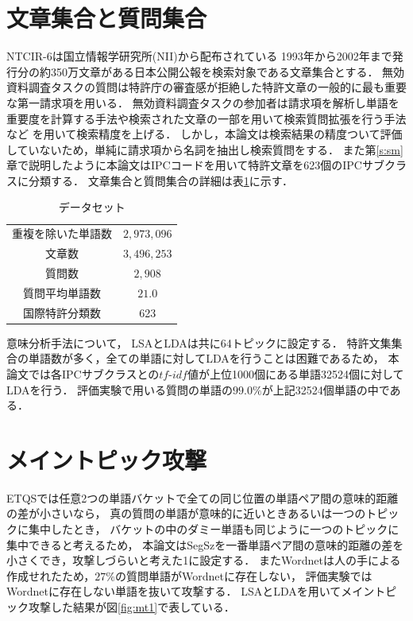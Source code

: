 \documentclass[master]{suribt}
\theoremstyle{definition}
\begin{document}
 \section{文章集合と質問集合}\label{s:ex}
 NTCIR-6は国立情報学研究所(NII)から配布されている
 1993年から2002年まで発行分の約350万文章がある日本公開公報を検索対象である文章集合とする．
 無効資料調査タスクの質問は特許庁の審査感が拒絶した特許文章の一般的に最も重要な第一請求項を用いる．
 無効資料調査タスクの参加者は請求項を解析し単語を重要度を計算する手法や検索された文章の一部を用いて検索質問拡張を行う手法など
 を用いて検索精度を上げる．
 しかし，本論文は検索結果の精度ついて評価していないため，単純に請求項から名詞を抽出し検索質問をする．
 また第\ref{s:sm}章で説明したように本論文はIPCコードを用いて特許文章を623個のIPCサブクラスに分類する．
 文章集合と質問集合の詳細は表\ref{tab:data}に示す． 

 \begin{table}[!hbp]
 \center
 \begin{tabular}{|c|c|}
 \hline
 重複を除いた単語数 & $2,973,096$  \\
 文章数 & $3,496,253$ \\
 質問数 & $2,908$ \\
 質問平均単語数 & $21.0$ \\
 国際特許分類数 & 623 \\
 \hline
 \end{tabular}
 \caption{データセット}
 \label{tab:data}
 \end{table}

 意味分析手法について，
 LSAとLDAは共に64トピックに設定する．
 特許文集集合の単語数が多く，全ての単語に対してLDAを行うことは困難であるため，
 本論文では各IPCサブクラスとの$tf\text{-}idf$値が上位1000個にある単語32524個に対してLDAを行う．
 評価実験で用いる質問の単語の$99.0\%$が上記32524個単語の中である．

 \section{メイントピック攻撃}
 ETQSでは任意2つの単語バケットで全ての同じ位置の単語ペア間の意味的距離の差が小さいなら，
 真の質問の単語が意味的に近いときあるいは一つのトピックに集中したとき，
 バケットの中のダミー単語も同じように一つのトピックに集中できると考えるため，
 本論文はSegSzを一番単語ペア間の意味的距離の差を小さくでき，攻撃しづらいと考えた1に設定する．
 またWordnetは人の手による作成せれたため，$27\%$の質問単語がWordnetに存在しない，
 評価実験ではWordnetに存在しない単語を抜いて攻撃する．
 LSAとLDAを用いてメイントピック攻撃した結果が図\ref{fig:mt1}で表している．
  
\end{document}

